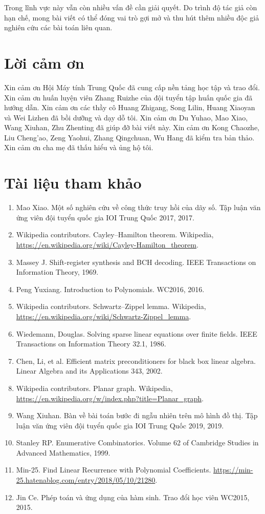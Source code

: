 \documentclass[11pt]{article}
\begin{document}
Trong lĩnh vực này vẫn còn nhiều vấn đề cần giải quyết. Do trình độ tác giả
còn hạn chế, mong bài viết có thể đóng vai trò gợi mở và thu hút thêm nhiều
độc giả nghiên cứu các bài toán liên quan.

\section*{Lời cảm ơn}

Xin cảm ơn Hội Máy tính Trung Quốc đã cung cấp nền tảng học tập và trao đổi.
Xin cảm ơn huấn luyện viên Zhang Ruizhe của đội tuyển tập huấn quốc gia đã
hướng dẫn. Xin cảm ơn các thầy cô Huang Zhigang, Song Lilin, Huang Xiaoyan và
Wei Lizhen đã bồi dưỡng và dạy dỗ tôi. Xin cảm ơn Du Yuhao, Mao Xiao, Wang
Xiuhan, Zhu Zhenting đã giúp đỡ bài viết này. Xin cảm ơn Kong Chaozhe, Liu
Cheng'ao, Zeng Yaohui, Zhang Qingchuan, Wu Hang đã kiểm tra bản thảo. Xin cảm
ơn cha mẹ đã thấu hiểu và ủng hộ tôi.

\section*{Tài liệu tham khảo}

\begin{enumerate}
  \item Mao Xiao. Một số nghiên cứu về công thức truy hồi của dãy số. Tập luận
        văn ứng viên đội tuyển quốc gia IOI Trung Quốc 2017, 2017.
  \item Wikipedia contributors. Cayley--Hamilton theorem. Wikipedia,
        \url{https://en.wikipedia.org/wiki/Cayley-Hamilton_theorem}.
  \item Massey J. Shift-register synthesis and BCH decoding. IEEE Transactions
        on Information Theory, 1969.
  \item Peng Yuxiang. Introduction to Polynomials. WC2016, 2016.
  \item Wikipedia contributors. Schwartz--Zippel lemma. Wikipedia,
        \url{https://en.wikipedia.org/wiki/Schwartz-Zippel_lemma}.
  \item Wiedemann, Douglas. Solving sparse linear equations over finite fields.
        IEEE Transactions on Information Theory 32.1, 1986.
  \item Chen, Li, et al. Efficient matrix preconditioners for black box linear
        algebra. Linear Algebra and its Applications 343, 2002.
  \item Wikipedia contributors. Planar graph. Wikipedia,
        \url{https://en.wikipedia.org/w/index.php?title=Planar_graph}.
  \item Wang Xiuhan. Bàn về bài toán bước đi ngẫu nhiên trên mô hình đồ thị.
        Tập luận văn ứng viên đội tuyển quốc gia IOI Trung Quốc 2019, 2019.
  \item Stanley RP. Enumerative Combinatorics. Volume 62 of Cambridge Studies
        in Advanced Mathematics, 1999.
  \item Min-25. Find Linear Recurrence with Polynomial Coefficients.
        \url{https://min-25.hatenablog.com/entry/2018/05/10/21280}.
  \item Jin Ce. Phép toán và ứng dụng của hàm sinh. Trao đổi học viên WC2015,
        2015.
\end{enumerate}
\end{document}
